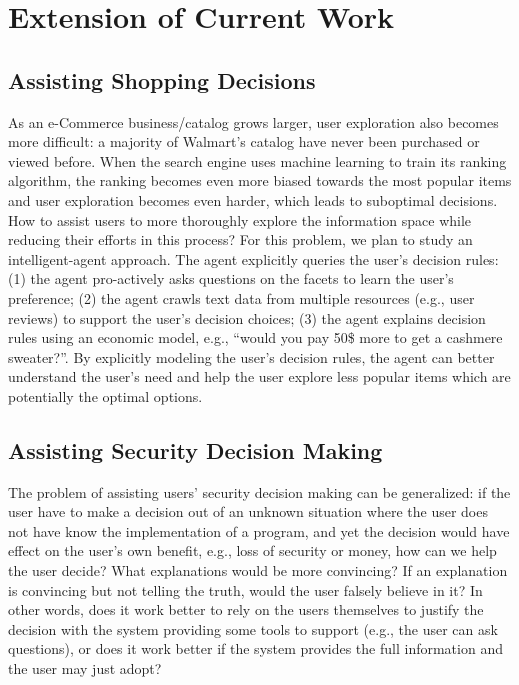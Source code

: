 \section{Extension of Current Work}

\subsection{Assisting Shopping Decisions}

As an e-Commerce business/catalog grows larger, user exploration also becomes more difficult: a majority of Walmart's catalog have never been purchased or viewed before. When the search engine uses machine learning to train its ranking algorithm, the ranking becomes even more biased towards the most popular items and user exploration becomes even harder, which leads to suboptimal decisions. How to assist users to more thoroughly explore the information space while reducing their efforts in this process? For this problem, we plan to study an intelligent-agent approach. The agent explicitly queries the user's decision rules: (1) the agent pro-actively asks questions on the facets to learn the user's preference; (2) the agent crawls text data from multiple resources (e.g., user reviews) to support the user's decision choices; (3) the agent explains decision rules using an economic model, e.g., ``would you pay 50\$ more to get a cashmere sweater?''. By explicitly modeling the user's decision rules, the agent can better understand the user's need and help the user explore less popular items which are potentially the optimal options. 

\subsection{Assisting Security Decision Making}
\label{sec:mobile_future}

The problem of assisting users' security decision making can be generalized: if the user have to make a decision out of an unknown situation where the user does not have know the implementation of a program, and yet the decision would have effect on the user's own benefit, e.g., loss of security or money, how can we help the user decide? What explanations would be more convincing? If an explanation is convincing but not telling the truth, would the user falsely believe in it? In other words, does it work better to rely on the users themselves to justify the decision with the system providing some tools to support (e.g., the user can ask questions), or does it work better if the system provides the full information and the user may just adopt?  

